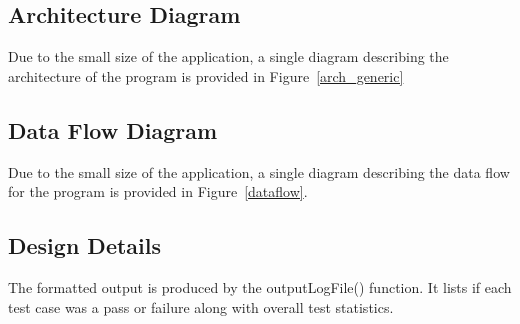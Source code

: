 \subsection{ Architecture  Diagram}
Due to the small size of the application, a single diagram describing the architecture of the program is provided in Figure~\ref{arch_generic}


\subsection{Data Flow Diagram}
Due to the small size of the application, a single diagram describing the data flow for the program is provided in Figure~\ref{dataflow}.

\subsection{Design Details}
The formatted output is produced by the outputLogFile() function. It lists if each test case was a pass or failure along with overall test statistics. 



